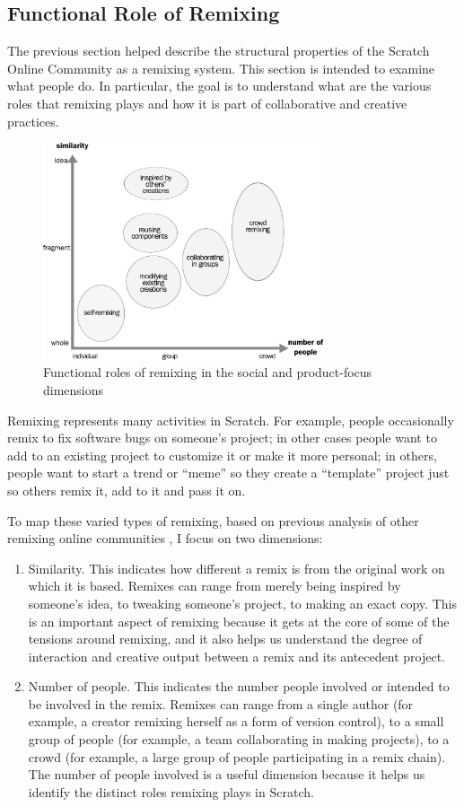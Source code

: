 \subsection{Functional Role of Remixing}

The previous section helped describe the structural properties of the Scratch Online Community as a remixing system.
This section is intended to examine what people do.
In particular, the goal is to understand what are the various roles that remixing plays and how it is part of collaborative and creative practices.

\begin{figure}
\centering
\includegraphics[width=3.25in]{figures/function.pdf}
\caption{Functional roles of remixing in the social and product-focus dimensions}
\label{fig:function}
\end{figure}

Remixing represents many activities in Scratch.
For example, people occasionally remix to fix software bugs on someone's project; in other cases people want to add to an existing project to customize it or make it more personal; in others, people want to start a trend or ``meme'' so they create a ``template'' project just so others remix it, add to it and pass it on.

To map these varied types of remixing, based on previous analysis of other remixing online communities \citep{seneviratne_remix_2010}, I focus on two dimensions:
\begin{enumerate}
\item{Similarity}. This indicates how different a remix is from the original work on which it is based. 
Remixes can range from merely being inspired by someone's idea, to tweaking someone's project, to making an exact copy.
This is an important aspect of remixing because it gets at the core of some of the tensions around remixing, and it also helps us understand the degree of interaction and creative output between a remix and its antecedent project.
\item{Number of people}. This indicates the number people involved or intended to be involved in the remix.
Remixes can range from a single author (for example, a creator remixing herself as a form of version control), to a small group of people (for example, a team collaborating in making projects), to a crowd (for example, a large group of people participating in a remix chain).
The number of people involved is a useful dimension because it helps us identify the distinct roles remixing plays in Scratch.
\end{enumerate}

